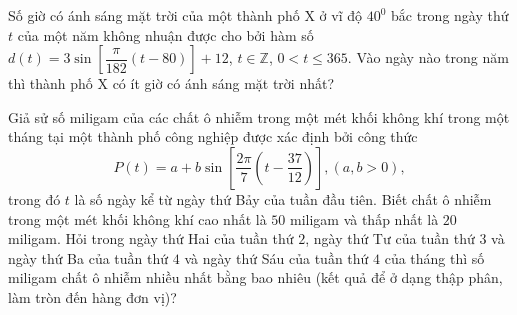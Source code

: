 \begin{ex}%
	Số giờ có ánh sáng mặt trời của  một thành phố X ở vĩ độ $40^0$ bắc trong ngày thứ $t$ của một năm không nhuận được cho bởi hàm số $d(t)=3\sin\left[\dfrac{\pi}{182}\left(t-80\right)\right]+12$, $t\in\mathbb{Z}$, $0<t\leq 365$. Vào ngày nào trong năm thì thành phố X có ít giờ có ánh sáng mặt trời nhất?
\end{ex}

\begin{ex}%
	Giả sử số miligam của các chất ô nhiễm trong một mét khối không khí trong một tháng tại một thành phố công nghiệp được xác định bởi công thức $$P(t)=a+b \sin \left[\dfrac{2 \pi}{7}\left(t-\dfrac{37}{12}\right)\right], (a, b>0), $$ trong đó $t$ là số ngày kể từ ngày thứ Bảy của tuần đầu tiên. Biết chất ô nhiễm trong một mét khối không khí cao nhất là $50$ miligam và thấp nhất là $20$ miligam. Hỏi trong ngày thứ Hai của tuần thứ $2$, ngày thứ Tư của tuần thứ $3$ và ngày thứ Ba của tuần thứ $4$ và ngày thứ Sáu  của tuần thứ $4$ của tháng thì số miligam chất ô nhiễm nhiều nhất bằng bao nhiêu (kết quả để ở dạng thập phân, làm tròn đến hàng đơn vị)?
\end{ex}

